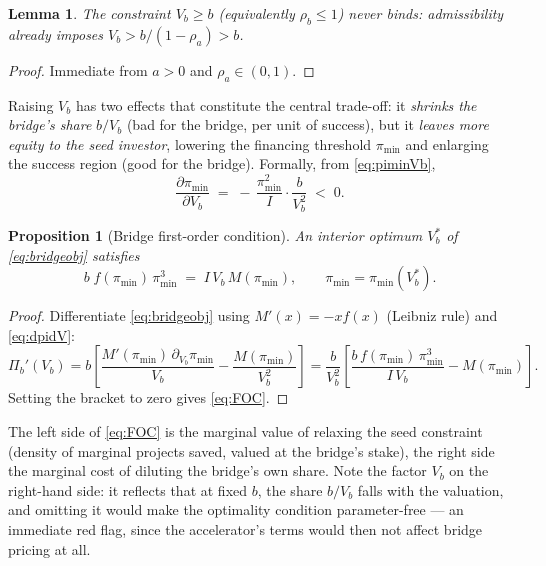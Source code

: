 \documentclass[11pt]{article}
\newtheorem{proposition}{Proposition}
\newtheorem{lemma}{Lemma}
\theoremstyle{definition}
\newcommand{\pimin}{\pi_{\min}}
\begin{document}
\begin{lemma}\label{lem:constraint}
The constraint $V_b \ge b$ (equivalently $\rho_b \le 1$) never binds: admissibility already imposes $V_b > b/(1-\rho_a) > b$.
\end{lemma}

\begin{proof}
Immediate from $a>0$ and $\rho_a \in (0,1)$.
\end{proof}

Raising $V_b$ has two effects that constitute the central trade-off: it \emph{shrinks the bridge's share} $b/V_b$ (bad for the bridge, per unit of success), but it \emph{leaves more equity to the seed investor}, lowering the financing threshold $\pimin$ and enlarging the success region (good for the bridge). Formally, from \eqref{eq:piminVb},
\begin{equation}
\frac{\partial \pimin}{\partial V_b}
\;=\; -\,\frac{\pimin^2}{I}\cdot\frac{b}{V_b^{2}} \;<\; 0 .
\label{eq:dpidV}
\end{equation}

\begin{proposition}[Bridge first-order condition]\label{prop:foc}
An interior optimum $V_b^{*}$ of \eqref{eq:bridgeobj} satisfies
\begin{equation}
b\; f(\pimin)\,\pimin^{3}
\;=\;
I\, V_b\, M(\pimin),
\qquad \pimin = \pimin(V_b^{*}).
\label{eq:FOC}
\end{equation}
\end{proposition}

\begin{proof}
Differentiate \eqref{eq:bridgeobj} using $M'(x) = -x f(x)$ (Leibniz rule) and \eqref{eq:dpidV}:
\[
\Pi_b'(V_b)
= b\left[\frac{M'(\pimin)\,\partial_{V_b}\pimin}{V_b} - \frac{M(\pimin)}{V_b^{2}}\right]
= \frac{b}{V_b^{2}}\left[\frac{b\, f(\pimin)\,\pimin^{3}}{I\,V_b} - M(\pimin)\right].
\]
Setting the bracket to zero gives \eqref{eq:FOC}.
\end{proof}

The left side of \eqref{eq:FOC} is the marginal value of relaxing the seed constraint (density of marginal projects saved, valued at the bridge's stake), the right side the marginal cost of diluting the bridge's own share. Note the factor $V_b$ on the right-hand side: it reflects that at fixed $b$, the share $b/V_b$ falls with the valuation, and omitting it would make the optimality condition parameter-free --- an immediate red flag, since the accelerator's terms would then not affect bridge pricing at all.
\end{document}
